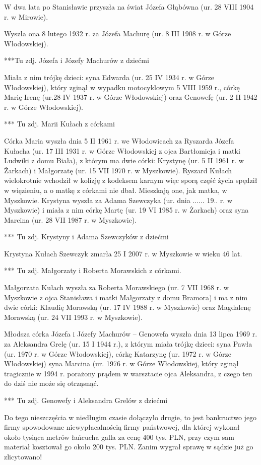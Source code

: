 W dwa lata po Stanisławie przyszła na świat Józefa Głąbówna (ur. 28 VIII 1904 r. w Mirowie).

Wyszła ona 8 lutego 1932 r. za Józefa Machurę (ur. 8 III 1908 r. w Górze Włodowskiej).

{\color{red}
***Tu zdj. Józefa i Józefy Machurów z dziećmi}

Miała z nim trójkę dzieci: syna Edwarda (ur. 25 IV 1934 r. w Górze Włodowskiej), który zginął w wypadku motocyklowym 5 VIII 1959 r., córkę Marię Irenę (ur.28 IV 1937 r. w Górze Włodowskiej) oraz Genowefę (ur. 2 II 1942 r. w Górze Włodowskiej).

{\color{red}
*** Tu zdj. Marii Kułach z córkami}

Córka Maria wyszła dnia 5 II 1961 r. we Włodowicach za Ryszarda Józefa Kułacha (ur. 17 III 1931 r. w Górze Włodowskiej z ojca Bartłomieja i matki Ludwiki z domu Biała), z którym ma dwie córki: Krystynę (ur. 5 II 1961 r. w Żarkach) i Małgorzatę (ur. 15 VII 1970 r. w Myszkowie). Ryszard Kułach wielokrotnie wchodził w kolizję z kodeksem karnym więc sporą część życia spędził w więzieniu, a o matkę z córkami nie dbał. Mieszkają one, jak matka, w Myszkowie. Krystyna wyszła za Adama Szewczyka (ur. dnia ...... 19.. r. w Myszkowie) i miała z nim córkę Martę (ur. 19 VI 1985 r. w Żarkach) oraz syna Marcina (ur. 28 VII 1987 r. w Myszkowie).

{\color{red}
*** Tu zdj. Krystyny i Adama Szewczyków z dziećmi}

Krystyna Kułach Szewczyk zmarła 25 I 2007 r. w Myszkowie w wieku 46 lat.

{\color{red}
*** Tu zdj. Małgorzaty i Roberta Morawskich z córkami.}

Małgorzata Kułach wyszła za Roberta Morawskiego (ur. 7 VII 1968 r. w Myszkowie z ojca Stanisława i matki Małgorzaty z domu Bramora) i ma z nim dwie córki: Klaudię Morawską (ur. 17 IV 1988 r. w Myszkowie) oraz Magdalenę Morawską (ur. 24 VII 1993 r. w Myszkowie). 

Młodsza  córka Józefa i Józefy Machurów -- Genowefa wyszła dnia 13 lipca 1969 r. za Aleksandra Grelę (ur. 15 I 1944 r.), z którym miała trójkę dzieci: syna Pawła (ur. 1970 r. w Górze Włodowskiej), córkę Katarzynę (ur. 1972 r. w Górze Włodowskiej) syna Marcina (ur. 1976 r. w Górze Włodowskiej, który zginął tragicznie w 1994 r. porażony prądem w warsztacie ojca Aleksandra, z czego ten do dziś nie może się otrząsnąć.

{\color{red}
*** Tu zdj. Genowefy i Aleksandra Grelów z dziećmi}

Do tego nieszczęścia w niedługim czasie dołączyło drugie, to jest bankructwo jego firmy spowodowane niewypłacalnością firmy państwowej, dla której wykonał około tysiąca metrów łańcucha galla za cenę 400 tys. PLN, przy czym sam materiał kosztował go około 200 tys. PLN. Zanim wygrał sprawę w sądzie już go zlicytowano!
